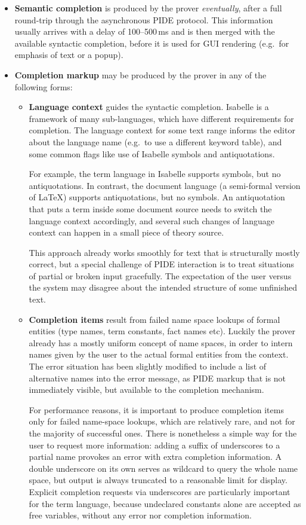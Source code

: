 \begin{isabellebody}
\begin{isamarkuptext}
\begin{itemize}
\item \textbf{Semantic completion} is produced by the prover
\emph{eventually}, after a full round-trip through the asynchronous PIDE
protocol. This information usually arrives with a delay of 100--500\,ms and
is then merged with the available syntactic completion, before it is used
for GUI rendering (e.g.\ for emphasis of text or a popup).

\item \textbf{Completion markup} may be produced by the prover in any of the
following forms:

\begin{itemize}

\item \textbf{Language context} guides the syntactic completion. Isabelle is
a framework of many sub-languages, which have different requirements for
completion. The language context for some text range informs the editor
about the language name (e.g.\ to use a different keyword table), and some
common flags like use of Isabelle symbols and antiquotations.

For example, the term language in Isabelle supports symbols, but no
antiquotations. In contrast, the document language (a semi-formal version of
{\LaTeX}) supports antiquotations, but no symbols. An antiquotation that
puts a term inside some document source needs to switch the language context
accordingly, and several such changes of language context can happen in a
small piece of theory source.

This approach already works smoothly for text that is structurally mostly
correct, but a special challenge of PIDE interaction is to treat situations
of partial or broken input gracefully. The expectation of the user versus
the system may disagree about the intended structure of some unfinished
text.

\item \textbf{Completion items} result from failed name space lookups of
formal entities (type names, term constants, fact names etc). Luckily the
prover already has a mostly uniform concept of name spaces, in order to
intern names given by the user to the actual formal entities from the
context. The error situation has been slightly modified to include a list of
alternative names into the error message, as PIDE markup that is not
immediately visible, but available to the completion mechanism.

For performance reasons, it is important to produce completion items only
for failed name-space lookups, which are relatively rare, and not for the
majority of successful ones. There is nonetheless a simple way for the user
to request more information: adding a suffix of underscores to a partial
name provokes an error with extra completion information. A double
underscore on its own serves as wildcard to query the whole name space, but
output is always truncated to a reasonable limit for display. Explicit
completion requests via underscores are particularly important for the term
language, because undeclared constants alone are accepted as free variables,
without any error nor completion information.


\end{itemize}
\end{itemize}
\end{isamarkuptext}
\end{isabellebody}

